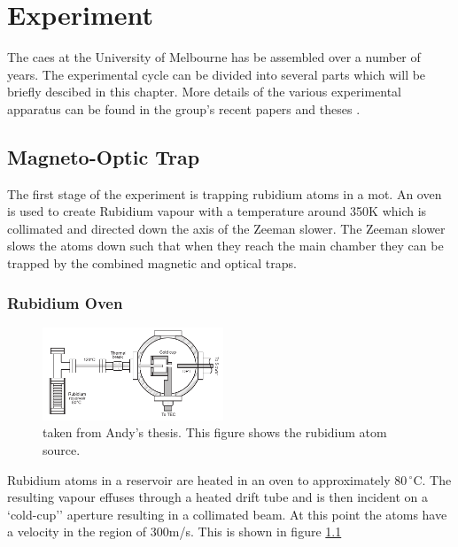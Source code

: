 \chapter{Experiment}

The \gls{caes} at the University of Melbourne has be assembled over a number of years. The experimental cycle can be divided into several parts which will be briefly descibed in this chapter. More details of the various experimental apparatus can be found in the group's recent papers \cite{bell_slow_2010, mcculloch_arbitrarily_2011, saliba_spatial_2012} and theses \cite{mcculloch_electron_2012, sheludko_shaped_2010, saliba_partially_2011}.


\section{Magneto-Optic Trap}

The first stage of the experiment is trapping rubidium atoms in a \gls{mot}. An oven is used to create Rubidium vapour with a temperature around 350K which is collimated and directed down the axis of the Zeeman slower. The Zeeman slower slows the atoms down such that when they reach the main chamber they can be trapped by the combined magnetic and optical traps.


\subsection{Rubidium Oven}

\begin{figure}
\vspace{-80pt}
\centering
\includegraphics[width=0.48\textwidth]{figs/oven.pdf}
\caption{{\color{red} taken from Andy's thesis.} This figure shows the rubidium atom source.}
\label{fig:oven}
\end{figure}

Rubidium atoms in a reservoir are heated in an oven to approximately $80\,^{\circ}\mathrm{C}$. The resulting vapour effuses through a heated drift tube and is then incident on a `cold-cup'' aperture resulting in a collimated beam. At this point the atoms have a velocity in the region of 300m/s. This is shown in figure \ref{fig:oven}


